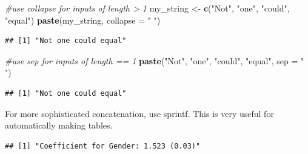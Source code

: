 \documentclass[]{book}
\newenvironment{Shaded}{\begin{snugshade}}{\end{snugshade}}
\newcommand{\CommentTok}[1]{\textcolor[rgb]{0.56,0.35,0.01}{\textit{#1}}}
\newcommand{\DataTypeTok}[1]{\textcolor[rgb]{0.13,0.29,0.53}{#1}}
\newcommand{\FloatTok}[1]{\textcolor[rgb]{0.00,0.00,0.81}{#1}}
\newcommand{\KeywordTok}[1]{\textcolor[rgb]{0.13,0.29,0.53}{\textbf{#1}}}
\newcommand{\NormalTok}[1]{#1}
\newcommand{\StringTok}[1]{\textcolor[rgb]{0.31,0.60,0.02}{#1}}
\theoremstyle{definition}
\theoremstyle{definition}
\theoremstyle{definition}
\theoremstyle{remark}
\begin{document}
\begin{Shaded}
\begin{Highlighting}[]
\begin{Shaded}
\begin{Highlighting}[]
\begin{Shaded}
\begin{Highlighting}[]
\begin{Shaded}
\begin{Highlighting}[]
\CommentTok{#use collapse for inputs of length > 1 }
\NormalTok{my_string <-}\StringTok{ }\KeywordTok{c}\NormalTok{(}\StringTok{"Not"}\NormalTok{, }\StringTok{"one"}\NormalTok{, }\StringTok{"could"}\NormalTok{, }\StringTok{"equal"}\NormalTok{)}
\KeywordTok{paste}\NormalTok{(my_string, }\DataTypeTok{collapse =} \StringTok{" "}\NormalTok{)}
\end{Highlighting}
\end{Shaded}

\begin{verbatim}
## [1] "Not one could equal"
\end{verbatim}

\begin{Shaded}
\begin{Highlighting}[]
\CommentTok{#use sep for inputs of length == 1 }
\KeywordTok{paste}\NormalTok{(}\StringTok{"Not"}\NormalTok{, }\StringTok{"one"}\NormalTok{, }\StringTok{"could"}\NormalTok{, }\StringTok{"equal"}\NormalTok{, }\DataTypeTok{sep =} \StringTok{" "}\NormalTok{)}
\end{Highlighting}
\end{Shaded}

\begin{verbatim}
## [1] "Not one could equal"
\end{verbatim}

For more sophisticated concatenation, use sprintf. This is very useful for automatically making tables.

\begin{Shaded}
\end{Shaded}

\begin{verbatim}
## [1] "Coefficient for Gender: 1.523 (0.03)"
\end{verbatim}

\begin{Shaded}
\begin{Highlighting}[]
\CommentTok{#%
\CommentTok{#%
\CommentTok{#%
\end{Highlighting}
\end{Shaded}


\end{Highlighting}
\end{Shaded}
\end{Highlighting}
\end{Shaded}
\end{Highlighting}
\end{Shaded}
\end{document}
